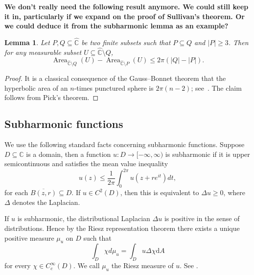\documentclass[12pt,a4paper,reqno]{amsart}
\newcommand{\Area}{\operatorname{Area}}
\theoremstyle{plain}
\newtheorem{lem}[thm]{Lemma}
\newcommand{\dA}{\mathrm dA}
\renewcommand{\subset}{\subseteq}
\theoremstyle{definition}
\theoremstyle{remark}
\numberwithin{equation}{section}
\newcommand \C{\mathbb{C}}
\begin{document}
\textbf{We don't really need the following result anymore. We could still keep it in, particularly
 if we expand on the proof of Sullivan's theorem. Or we could deduce it from the subharmonic
 lemma as an example?}

\begin{lem}\label{lem:increment}
    Let $P, Q \subset \widehat{\C}$ be two finite subsets such that $P \subset Q$ and $|P| \geq 3$. Then for any measurable subset $U \subset \widehat{\C} \setminus Q$, 
    $$
        \Area_{\widehat{\C} \setminus Q}(U) - \Area_{\widehat{\C} \setminus P}(U) \leq 2\pi(|Q| - |P|).
    $$
\end{lem}
\begin{proof}
  It is a classical consequence of the Gauss--Bonnet
  theorem that the hyperbolic area of 
    an $n$-times punctured sphere is 
    $2\pi (n-2)$; see~\cite[Theorem~10.4.3]{Beardon1983}. The claim follows
    from Pick's theorem.
\end{proof}


\subsection*{Subharmonic functions}
We use the following standard facts concerning subharmonic  functions. Suppose $D\subset \C$ is a domain, then a function $u\colon D \to [-\infty,\infty)$ is subharmonic if it is upper semicontinuous and satisfies the mean value inequality
\[u(z) \leq \frac{1}{2\pi}\int_0^{2\pi} u(z+re^{it})dt,\]
for each $\overline{B(z,r)}\subset D$. If $u\in C^2(D)$, then this is equivalent to $\Delta u \geq 0$, where $\Delta$ denotes the Laplacian. 


If $u$ is subharmonic, 
the distributional Laplacian $\Delta u$ is positive in the sense of distributions. Hence by the Riesz representation theorem there exists a unique positive measure $\mu_u$ on $D$ such that
\[\int_D \chi d\mu_u=\int_D u\Delta \chi \dA\] for every $\chi\in C^\infty_c(D)$. We call $\mu_u$ the Riesz measure of $u$. See \cite{hayman-kennedy76}. 
\end{document}

